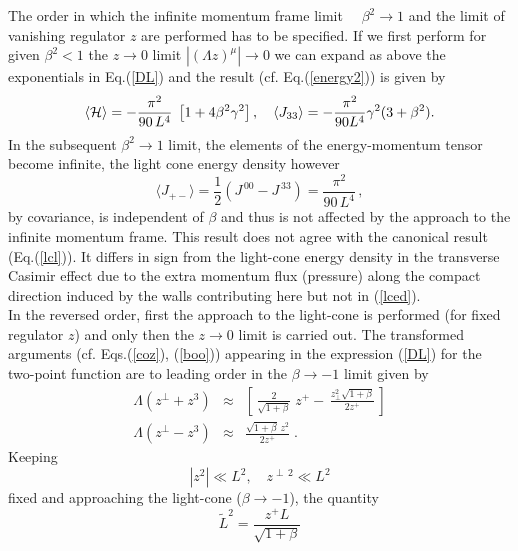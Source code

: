 \documentclass[a4paper,twocolumn,eqsecnum,aps]{revtex4}
\begin{document}
 The order in which the  infinite momentum frame  limit $\quad \beta^2 \rightarrow 1$ and  the limit of vanishing regulator $z$ are performed has to be specified. If we first perform for given $\beta^2 < 1$ the $z \rightarrow 0$ limit $ |(\Lambda z)^{\mu}| \rightarrow 0$  we can expand as above  the exponentials in Eq.(\ref{DL}) and   the result (cf. Eq.(\ref{energy2})) is given by  
 \begin{equation}
  \label{edmf}
  \langle {\cal H}\rangle  = -\frac{\pi^{2}}{90 \, L^{4}} \; \left [1 + 4 \beta^{2} \gamma ^{2} \right ] , 
\quad \langle J_{33}\rangle =  - \frac{\pi^2}{90 L^{4}} \gamma ^{2}(3 + \beta ^{2} ).
\end{equation}
In the subsequent $\beta^2 \rightarrow 1$ limit, the elements of the energy-momentum tensor become infinite, the  light cone energy density however 
\begin{equation}
  \label{lced2}
  \langle J_{+ - }\rangle = \frac{1}{2} \left (J^{\,00} - J^{\,33} \right ) = \frac{\pi ^{2}}{90 \, L^{4}}\, ,
\end{equation}
by covariance,  is independent of $\beta$ and thus is not affected by the approach to the infinite momentum frame. This result does 
not agree  with the canonical result (Eq.(\ref{lcl})). It differs in sign from the light-cone energy density in the transverse Casimir effect due to the extra momentum flux (pressure) along the compact direction induced by the walls contributing here but not in (\ref{lced}). \\ 
In the reversed order, first the  approach to the light-cone is performed (for fixed regulator $z$) and only then  the $z \rightarrow 0$ limit is carried out. 
The transformed arguments (cf. Eqs.(\ref{coz}), (\ref{boo})) appearing in the expression (\ref{DL}) for the two-point function are to leading order in the  $\beta \rightarrow -1$ limit  given by 
\begin{eqnarray*}
\Lambda (z^{\perp}+ z^{3}) &\approx& \left[\,\frac{2}{\sqrt{1+\beta}} \; z^{+} - \,
\frac{z^{2}_{\bot} \sqrt{1+\beta}}{2 z^{+}}\,\right]\nonumber\\
 \Lambda (z^{\perp}- z^{3}) &\approx& \frac{\sqrt{1+\beta}\,  z^2}{2z^{+}}\;.
\end{eqnarray*}
Keeping 
\begin{equation}
  \label{un1}
|z^2| \ll L^2 , \quad z^{\perp\, 2} \ll L^2
\end{equation}
fixed and approaching the light-cone ($\beta \rightarrow -1$),  the quantity 
\begin{equation}
  \label{Lz}
\tilde{L}^2 = \frac{ z^{+} L}{\sqrt{1+\beta}} 
\end{equation}
\end{document}
